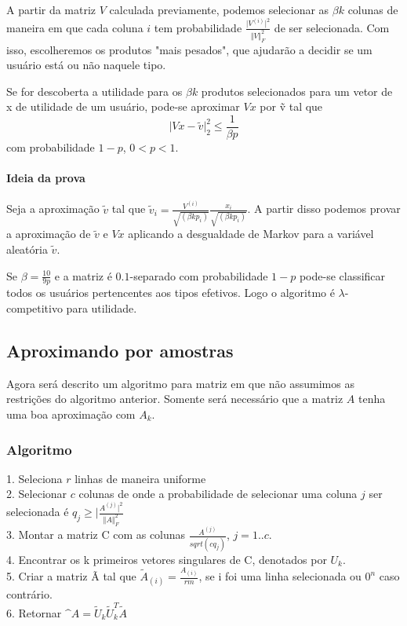 \documentclass[a4paper,10pt]{article}
\begin{document}
A partir da matriz $V$ calculada previamente, podemos selecionar as $\beta k$ colunas de maneira em que cada  
coluna $i$ tem probabilidade $\frac{\vert V^{(i)} \vert^2}{\Vert V \Vert^2_F}$ de ser selecionada. Com 
isso, escolheremos os produtos "mais pesados", que ajudarão a decidir se um usuário está ou não naquele tipo.

\begin{lema}
Se for descoberta a utilidade para os $\beta k$ produtos selecionados para um vetor
de x de utilidade de um usuário, pode-se aproximar $V x$ por \~v tal que 
\begin{equation}
\vert V x  - \tilde v \vert^2_2 \leq \frac{1}{\beta p}
\end{equation}
com probabilidade $1 - p$, $0 < p < 1$.
\end{lema}

\paragraph{Ideia da prova\\}

Seja a aproximação $\tilde v$ tal que $\tilde v_i = \frac {V^{(i)}}{\sqrt{(\beta k p_i)}} \frac{x_i}{\sqrt{(\beta k p_i)}}$.
 A partir disso podemos provar a aproximação de $\tilde v$ e $Vx$ aplicando a desgualdade de Markov para a variável 
aleatória $\tilde v$.


\begin{coro}
Se $\beta = \frac{10}{9p}$ e a matriz é $0.1$-separado com probabilidade $1 - p$
pode-se classificar todos os usuários pertencentes aos tipos efetivos. Logo o 
algoritmo é $\lambda$-competitivo  para utilidade.
\end{coro}

\subsection{Aproximando por amostras}

Agora será descrito um algoritmo para matriz em que não assumimos as restrições
do algoritmo anterior. Somente será necessário que a matriz $A$ tenha uma boa 
aproximação com $A_k$.

\subsubsection{Algoritmo}

1. Seleciona $r$ linhas de maneira uniforme \\
2. Selecionar $c$ colunas de onde a probabilidade de selecionar uma coluna $j$ ser selecionada
é  $q_j \geq \vert \frac{A^{(j)} \vert^2}{\Vert A \Vert^2_F}$ \\
3. Montar a matriz C com as colunas $\frac{A^(j)}{sqrt(cq_j)}$, $j = 1 .. c$. \\
4. Encontrar os k primeiros vetores singulares de C, denotados por $U_k$. \\
5. Criar a matriz Ã tal que 
$\tilde A_{(i)}  = \frac{A_{(i)}}{rm}$, se i foi uma linha selecionada ou $0^n$ caso contrário. \\
6. Retornar $\^A = \tilde U_k \tilde U_k^T \tilde A$
\end{document}
